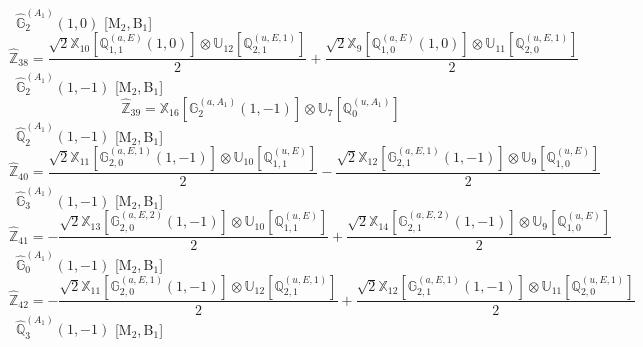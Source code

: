 \documentclass[fleqn,10pt,landscape]{article}
\begin{document}
\begin{itemize}
\begin{dmath*}
\end{dmath*}
\vspace{4mm}
\noindent {} $\,\,\,\hat{\mathbb{G}}_{2}^{(A_{1})}(1,0)$ [M$_{2}$,\,B$_{1}$]
\begin{dmath*}
\hat{\mathbb{Z}}_{38}=\frac{\sqrt{2} \mathbb{X}_{10}[\mathbb{Q}_{1,1}^{(a,E)}(1,0)] \otimes\mathbb{U}_{12}[\mathbb{Q}_{2,1}^{(u,E,1)}]}{2} + \frac{\sqrt{2} \mathbb{X}_{9}[\mathbb{Q}_{1,0}^{(a,E)}(1,0)] \otimes\mathbb{U}_{11}[\mathbb{Q}_{2,0}^{(u,E,1)}]}{2}
\end{dmath*}
\vspace{4mm}
\noindent {} $\,\,\,\hat{\mathbb{G}}_{2}^{(A_{1})}(1,-1)$ [M$_{2}$,\,B$_{1}$]
\begin{dmath*}
\hat{\mathbb{Z}}_{39}=\mathbb{X}_{16}[\mathbb{G}_{2}^{(a,A_{1})}(1,-1)] \otimes\mathbb{U}_{7}[\mathbb{Q}_{0}^{(u,A_{1})}]
\end{dmath*}
\vspace{4mm}
\noindent {} $\,\,\,\hat{\mathbb{Q}}_{2}^{(A_{1})}(1,-1)$ [M$_{2}$,\,B$_{1}$]
\begin{dmath*}
\hat{\mathbb{Z}}_{40}=\frac{\sqrt{2} \mathbb{X}_{11}[\mathbb{G}_{2,0}^{(a,E,1)}(1,-1)] \otimes\mathbb{U}_{10}[\mathbb{Q}_{1,1}^{(u,E)}]}{2} - \frac{\sqrt{2} \mathbb{X}_{12}[\mathbb{G}_{2,1}^{(a,E,1)}(1,-1)] \otimes\mathbb{U}_{9}[\mathbb{Q}_{1,0}^{(u,E)}]}{2}
\end{dmath*}
\vspace{4mm}
\noindent {} $\,\,\,\hat{\mathbb{G}}_{3}^{(A_{1})}(1,-1)$ [M$_{2}$,\,B$_{1}$]
\begin{dmath*}
\hat{\mathbb{Z}}_{41}=- \frac{\sqrt{2} \mathbb{X}_{13}[\mathbb{G}_{2,0}^{(a,E,2)}(1,-1)] \otimes\mathbb{U}_{10}[\mathbb{Q}_{1,1}^{(u,E)}]}{2} + \frac{\sqrt{2} \mathbb{X}_{14}[\mathbb{G}_{2,1}^{(a,E,2)}(1,-1)] \otimes\mathbb{U}_{9}[\mathbb{Q}_{1,0}^{(u,E)}]}{2}
\end{dmath*}
\vspace{4mm}
\noindent {} $\,\,\,\hat{\mathbb{G}}_{0}^{(A_{1})}(1,-1)$ [M$_{2}$,\,B$_{1}$]
\begin{dmath*}
\hat{\mathbb{Z}}_{42}=- \frac{\sqrt{2} \mathbb{X}_{11}[\mathbb{G}_{2,0}^{(a,E,1)}(1,-1)] \otimes\mathbb{U}_{12}[\mathbb{Q}_{2,1}^{(u,E,1)}]}{2} + \frac{\sqrt{2} \mathbb{X}_{12}[\mathbb{G}_{2,1}^{(a,E,1)}(1,-1)] \otimes\mathbb{U}_{11}[\mathbb{Q}_{2,0}^{(u,E,1)}]}{2}
\end{dmath*}
\vspace{4mm}
\noindent {} $\,\,\,\hat{\mathbb{Q}}_{3}^{(A_{1})}(1,-1)$ [M$_{2}$,\,B$_{1}$]

\end{itemize}
\end{document}

